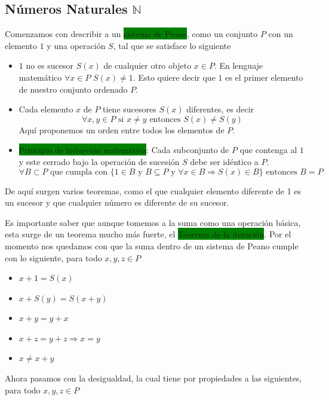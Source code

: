 \documentclass[11pt]{article}
\begin{document}
\subsection{Números Naturales $\mathbb{N}$}

Comenzamos con describir a un \colorbox{Green}{sistema de Peano}, como un conjunto $P$ con un elemento $1$ y una operación $S$, tal que se satisface lo siguiente

\begin{itemize}
    \item $1$ no es sucesor $S(x)$ de cualquier otro objeto $x\in P$. En lenguaje matemático $\forall x \in P$ $S(x)\neq1$. Esto quiere decir que $1$ es el primer elemento de nuestro conjunto ordenado $P$.
    \item Cada elemento $x$ de $P$ tiene sucesores $S(x)$ diferentes, es decir
    \[
    \forall x,y \in P \text{ si } x\neq y \text{ entonces } S(x)\neq S(y)
    \]
    Aquí proponemos un orden entre todos los elementos de $P$.
    \item \colorbox{Green}{Principio de inducción matemática}: Cada subconjunto de $P$ que contenga al $1$ y este cerrado bajo la operación de sucesión $S$ debe ser idéntico a $P$.
    \[
    \forall B \subset P \text{ que cumpla con } \{ 1\in B \text{ y } B \subseteq P \text{ y } \forall x\in B \Longrightarrow S(x)\in B \}    \text{ entonces } B=P
    \] 
\end{itemize}

De aquí surgen varios teoremas, como el que cualquier elemento diferente de 1 es un sucesor y que cualquier número es diferente de su sucesor.

Es importante saber que aunque tomemos a la suma como una operación básica, esta surge de un teorema mucho más fuerte, el \colorbox{Green}{Teorema de la iteración}. Por el momento nos quedamos con que la suma dentro de un sistema de Peano cumple con lo siguiente, para todo $x,y,z\in P$

\begin{itemize}
    \item $x + 1=S(x)$
    \item $x+S(y)=S(x+y)$
    \item $x+y=y+x$
    \item $x+z=y+z \Longrightarrow x=y$
    \item $x\neq x+y$
\end{itemize}

Ahora pasamos con la desigualdad, la cual tiene por propiedades a las siguientes, para todo $x,y,z\in P$
\end{document}
